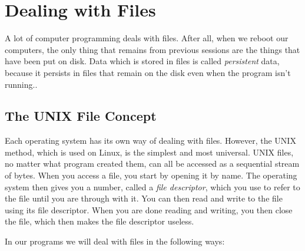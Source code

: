 \chapter{Dealing with Files}
\label{filesch}

% 
% 
% 
% 

A lot of computer programming deals with files.  After all, when we reboot our
computers, the only thing that remains from previous sessions are 
the things that have been put on disk.  Data which is stored in 
files is called \emph{persistent} data, 
because it persists in files that remain on the disk even when the program isn't running..

\section{The UNIX File Concept}

Each operating system has its own way of dealing with files.  However, the
UNIX method, which is used on Linux, is the simplest and most universal.
UNIX files, no matter what program created them, can all be accessed as a 
sequential stream of bytes.  When you access a file, you start by opening it by name.
The operating system then gives you a number, called a 
\emph{file descriptor}, 
which you use to refer to the file until you are
through with it.  You can then read and write to the file using its
file descriptor.  When you are done reading and writing, you then close 
the file, which then makes the file descriptor useless.

In our programs we will deal with files in the following ways:

